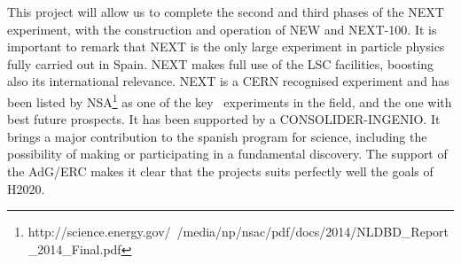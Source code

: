 This project will allow us to complete the second and third phases of the NEXT experiment, with the construction and operation of NEW and NEXT-100.  It is important to remark that NEXT is the only large experiment in particle physics fully carried out in Spain. NEXT makes full use of the LSC facilities, boosting also its international relevance.  NEXT is a CERN recognised experiment and has been listed by NSA\footnote{http://science.energy.gov/~/media/np/nsac/pdf/docs/2014/NLDBD\_Report\_2014\_Final.pdf} as one of the key \bbonu\ experiments in the field, and the one with best future prospects. It has been supported by a CONSOLIDER-INGENIO. It brings a major contribution to the spanish program for science, including the possibility of making or participating in a fundamental discovery. The support of the AdG/ERC makes it clear that the projects suits perfectly well the goals of H2020.
